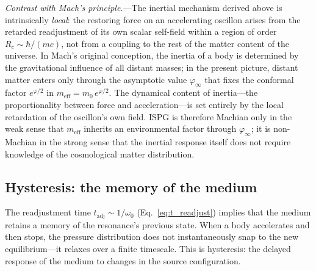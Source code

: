 \documentclass[aps,prd,onecolumn,superscriptaddress,nofootinbib,showpacs,12pt,notitlepage]{revtex4-2}
\newcommand{\meff}{m_{\mathrm{eff}}}
\begin{document}
\textit{Contrast with Mach's principle.}---The
inertial mechanism derived above is intrinsically
\emph{local}: the restoring force on an accelerating
oscillon arises from the retarded readjustment of
its own scalar self-field within a region of order
$R_{c} \sim \hbar/(mc)$, not from a coupling to the
rest of the matter content of the universe.  In
Mach's original conception, the inertia of a body is
determined by the gravitational influence of all
distant masses; in the present picture, distant matter
enters only through the asymptotic value
$\varphi_{\infty}$ that fixes the conformal factor
$e^{\varphi/2}$ in $\meff = m_{0}\,e^{\varphi/2}$.
The dynamical content of inertia---the proportionality
between force and acceleration---is set entirely by
the local retardation of the oscillon's own field.
ISPG is therefore Machian only in the weak sense that
$\meff$ inherits an environmental factor through
$\varphi_{\infty}$; it is non-Machian in the strong
sense that the inertial response itself does not
require knowledge of the cosmological matter
distribution.

\subsection{Hysteresis: the memory of the medium}
\label{sec:hysteresis_quantum}

The readjustment time $t_{\mathrm{adj}} \sim 1/\omega_0$
(Eq.~\ref{eq:t_readjust}) implies that the medium
retains a memory of the resonance's previous state.
When a body accelerates and then stops, the pressure
distribution does not instantaneously snap to the new
equilibrium---it relaxes over a finite timescale.
This is hysteresis: the delayed response of the medium
to changes in the source configuration.
\end{document}
